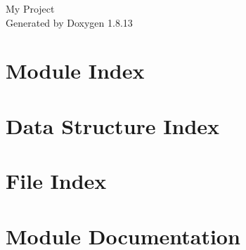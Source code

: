 \documentclass[twoside]{book}
\newcommand{\+}{\discretionary{\mbox{\scriptsize$\hookleftarrow$}}{}{}}
\newcommand{\clearemptydoublepage}{%
  \newpage{\pagestyle{empty}\cleardoublepage}%
}
\begin{document}
\hypersetup{pageanchor=false,
             bookmarksnumbered=true,
             pdfencoding=unicode
            }
\begin{titlepage}
\vspace*{7cm}
\begin{center}%
{\Large My Project }\\
\vspace*{1cm}
{\large Generated by Doxygen 1.8.13}\\
\end{center}
\end{titlepage}
\clearemptydoublepage
{}
\tableofcontents
\clearemptydoublepage
{}
\hypersetup{pageanchor=true}

\chapter{Module Index}

\chapter{Data Structure Index}

\chapter{File Index}

\chapter{Module Documentation}
















\end{document}

